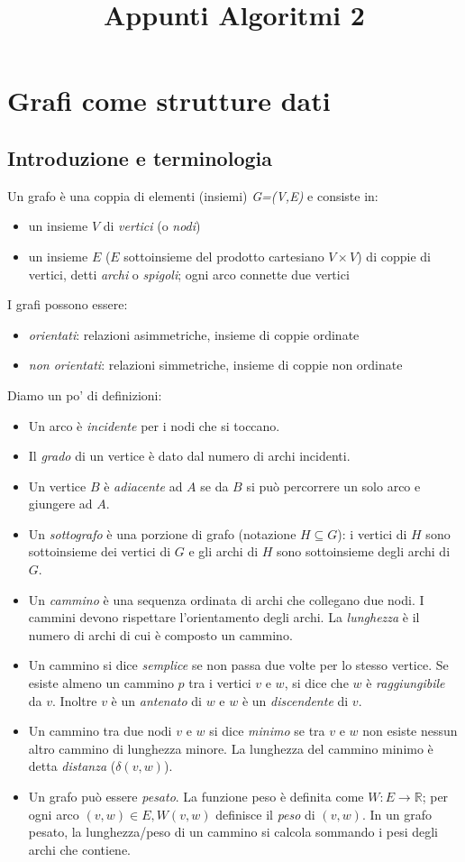 \documentclass[11pt]{book}
\title{Appunti Algoritmi 2}
\begin{document}
\tableofcontents
\listofalgorithms

\newpage
{}
\chapter{Grafi come strutture dati}
\section{Introduzione e terminologia}
Un grafo è una coppia di elementi (insiemi) \textit{G=(V,E)} e consiste in:
\begin{itemize}
    \item un insieme $V$ di \textit{vertici} (o \textit{nodi})
    \item un insieme $E$ ($E$ sottoinsieme del prodotto cartesiano $V\times V$) di coppie di vertici, detti \textit{archi}
    o \textit{spigoli}; ogni arco connette due vertici
\end{itemize}
I grafi possono essere:
\begin{itemize}
    \item \textit{orientati}: relazioni asimmetriche, insieme di coppie ordinate
    \item \textit{non orientati}: relazioni simmetriche, insieme di coppie non ordinate
\end{itemize}
Diamo un po' di definizioni:
\begin{itemize}
    \item Un arco è \textit{incidente} per i nodi che si toccano.
    \item Il \textit{grado} di un vertice è dato dal numero di archi incidenti.
    \item Un vertice $B$ è \textit{adiacente} ad $A$ se da $B$ si può percorrere un solo arco e giungere ad $A$.
    \item Un \textit{sottografo} è una porzione di grafo (notazione $H\subseteq G$): i vertici di $H$ sono sottoinsieme 
    dei vertici di $G$ e gli archi di $H$ sono sottoinsieme degli archi di $G$.
    \item Un \textit{cammino} è una sequenza ordinata di archi che collegano due nodi. I cammini devono rispettare l'orientamento 
    degli archi. La \textit{lunghezza} è il numero di archi di cui è composto un cammino.
    \item Un cammino si dice \textit{semplice} se non passa due volte per lo stesso vertice. Se esiste almeno un cammino 
    $p$ tra i vertici $v$ e $w$, si dice che $w$ è \textit{raggiungibile} da $v$. Inoltre $v$ è un \textit{antenato} di 
    $w$ e $w$ è un \textit{discendente} di $v$.
    \item Un cammino tra due nodi $v$ e $w$ si dice \textit{minimo} se tra $v$ e $w$ non esiste nessun altro cammino di lunghezza 
    minore. La lunghezza del cammino minimo è detta \textit{distanza} ($\delta (v,w)$).
    \item Un grafo può essere \textit{pesato}. La funzione peso è definita come $W:E\rightarrow \mathbb{R}$; per ogni arco
    $(v,w)\in E,W(v,w)$ definisce il \textit{peso} di $(v,w)$. In un grafo pesato, la lunghezza/peso di un cammino si calcola 
    sommando i pesi degli archi che contiene.
\end{itemize}
\end{document}
